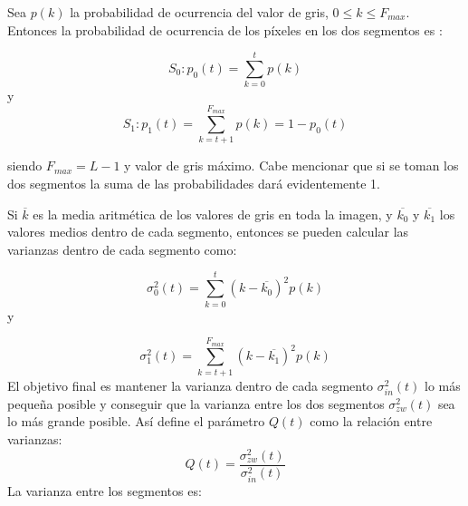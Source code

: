 Sea $p(k)$ la probabilidad de ocurrencia del valor de gris, $0 \leq k \leq  F_{max}$. Entonces la probabilidad de ocurrencia de los píxeles en los dos segmentos es \cite{gonzalez1992digital}:
%
%


\begin{equation}S_{0}:p_{0}(t) = \sum_{k=0}^t p(k)\end{equation} y \begin{equation}S_{1}:p_{1}(t)= \sum_{k=t+1}^{F_{max}} p(k) = 1-p_{0}(t)\end{equation}


siendo $F_{max}=L-1$ y valor de gris máximo. Cabe mencionar que si se toman los dos segmentos la suma de las probabilidades dará evidentemente 1.

Si $\overline{k}$  es la media aritmética de los valores de gris en toda la imagen, y $\overline{k_0}$
 y $\overline{k_1}$  los valores medios dentro de cada segmento, entonces se pueden calcular las varianzas dentro de cada segmento como:
%
%
%

\begin{equation}\sigma_0^2(t) = \sum_{k = 0}^t(k - \overline{k_{0}})^2p(k)\end{equation} y 

\begin{equation}
\sigma_1^2(t) = \sum_{k = t + 1}^{F_{max}}(k - \overline{k_{1}})^2p(k)\end{equation}
%
%
El objetivo final es mantener la varianza dentro de cada segmento $\sigma_{in}^2(t)$ lo más pequeña posible y conseguir que la varianza entre los dos segmentos $\sigma_{zw}^2(t)$ sea lo más grande posible. Así define el parámetro $Q(t)$ como la relación entre varianzas:
\begin{equation}Q(t)=\frac{\sigma_{zw}^2(t)}{\sigma_{in}^2(t)}\end{equation}
%
La varianza entre los segmentos es:

